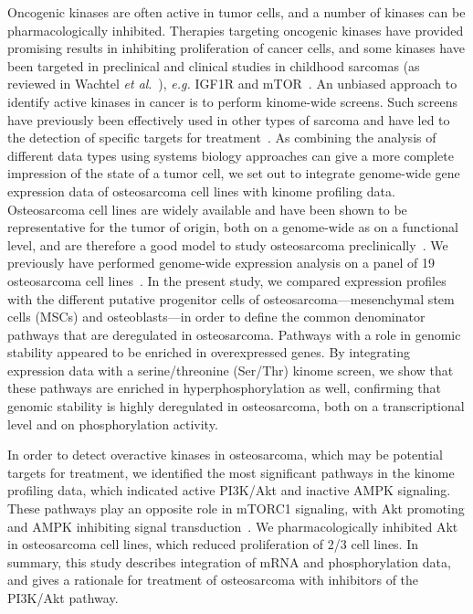 Oncogenic kinases are often active in tumor cells, and a number of kinases can be pharmacologically inhibited. Therapies targeting oncogenic kinases have provided promising results in inhibiting proliferation of cancer cells, and some kinases have been targeted in preclinical and clinical studies in childhood sarcomas (as reviewed in Wachtel {\it et al}.~\cite{wachtel2010targets}), {\it e.g.} IGF1R and mTOR~\cite{kolb2010r1507,chawla2012phase}. An unbiased approach to identify active kinases in cancer is to perform kinome\hyp{}wide screens. Such screens have previously been effectively used in other types of sarcoma and have led to the detection of specific targets for treatment~\cite{schrage2009kinome,willems2010kinome}. As combining the analysis of different data types using systems biology approaches can give a more complete impression of the state of a tumor cell, we set out to integrate genome\hyp{}wide gene expression data of osteosarcoma cell lines with kinome profiling data. Osteosarcoma cell lines are widely available and have been shown to be representative for the tumor of origin, both on a genome\hyp{}wide as on a functional level, and are therefore a good model to study osteosarcoma preclinically~\cite{kuijjer2011mrna,mohseny2011functional}. We previously have performed genome\hyp{}wide expression analysis on a panel of 19 osteosarcoma cell lines~\cite{ottaviano2010molecular}. In the present study, we compared expression profiles with the different putative progenitor cells of osteosarcoma---mesenchymal stem cells (MSCs) and osteoblasts---in order to define the common denominator pathways that are deregulated in osteosarcoma. Pathways with a role in genomic stability appeared to be enriched in overexpressed genes. By integrating expression data with a serine/threonine (Ser/Thr) kinome screen, we show that these pathways are enriched in hyperphosphorylation as well, confirming that genomic stability is highly deregulated in osteosarcoma, both on a transcriptional level and on phosphorylation activity.

In order to detect overactive kinases in osteosarcoma, which may be potential targets for treatment, we identified the most significant pathways in the kinome profiling data, which indicated active PI3K/Akt and inactive AMPK signaling. These pathways play an opposite role in mTORC1 signaling, with Akt promoting and AMPK inhibiting signal transduction~\cite{memmott2009akt}. We pharmacologically inhibited Akt in osteosarcoma cell lines, which reduced proliferation of 2/3 cell lines. In summary, this study describes integration of mRNA and phosphorylation data, and gives a rationale for treatment of osteosarcoma with inhibitors of the PI3K/Akt pathway.

